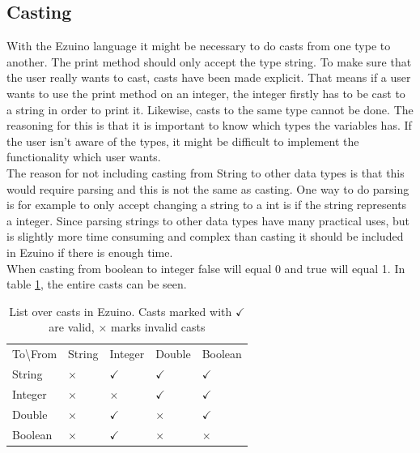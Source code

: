 \subsection*{Casting}
With the Ezuino language it might be necessary to do casts from one type to another.
The print method should only accept the type string. To make sure that the user really wants to cast, casts have been made explicit.
That means if a user wants to use the print method on an integer, the integer firstly has to be cast to a string in order to print it.
Likewise, casts to the same type cannot be done. The reasoning for this is that it is important to know which types the variables has. If the user isn't aware of the types, it might be difficult to implement the functionality which user wants.\\
The reason for not including casting from String to other data types is that this would require parsing and this is not the same as casting. One way to do parsing is for example to only accept changing a string to a int is if the string represents a integer. Since parsing strings to other data types have many practical uses, but is slightly more time consuming and complex than casting it should be included in Ezuino if there is enough time.  \\
When casting from boolean to integer false will equal 0 and true will equal 1.
In table \ref{tab:cast-overview}, the entire casts can be seen.
\begin{table}[H]
\centering
\begin{tabular}{lllll}
To\textbackslash From & String   & Integer      & Double       & Boolean      \\
String                & $\times$ & $\checkmark$ & $\checkmark$ & $\checkmark$ \\
Integer               & $\times$ & $\times$     & $\checkmark$ & $\checkmark$ \\
Double                & $\times$ & $\checkmark$ & $\times$     & $\checkmark$ \\
Boolean               & $\times$ & $\checkmark$ & $\times$     & $\times$    
\end{tabular}
\caption{List over casts in Ezuino. Casts marked with $\checkmark$ are valid, $\times$ marks invalid casts}
\label{tab:cast-overview}
\end{table}